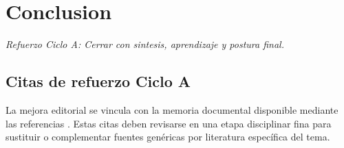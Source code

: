 \documentclass[
	spanish,
	letterpaper, oneside
]{article}
\begin{document}
\section{Conclusion}

\textit{Refuerzo Ciclo A: Cerrar con sintesis, aprendizaje y postura final.}



\nocite{iiiepeMAEM,iiiepeSitio}







































































































\subsection*{Citas de refuerzo Ciclo A}
La mejora editorial se vincula con la memoria documental disponible mediante las referencias \citep{iiiepeMAEM}. Estas citas deben revisarse en una etapa disciplinar fina para sustituir o complementar fuentes genéricas por literatura específica del tema.
\end{document}
